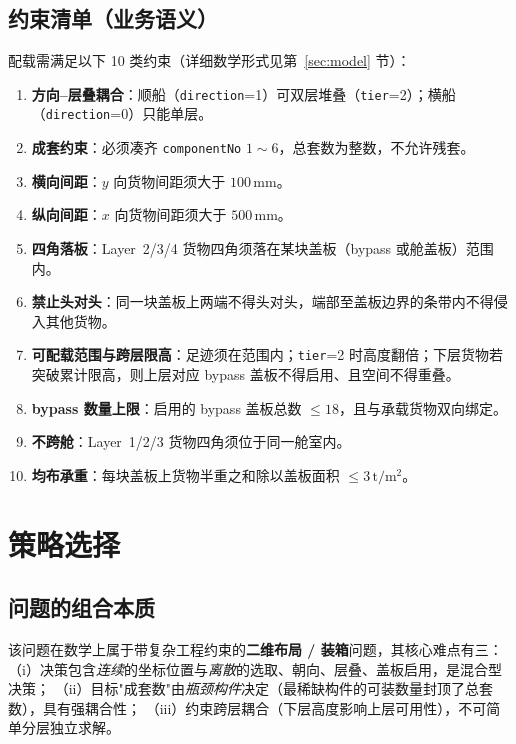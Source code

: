 \documentclass[11pt]{article}
\newcommand{\unit}[1]{\,\mathrm{#1}}
\begin{document}
\subsection{约束清单（业务语义）}
\label{sec:constraints-biz}
配载需满足以下 10 类约束（详细数学形式见第~\ref{sec:model} 节）：
\begin{enumerate}[label=C\arabic*.,leftmargin=2.6em,itemsep=2pt]
  \item \textbf{方向--层叠耦合}：顺船（\texttt{direction}=1）可双层堆叠（\texttt{tier}=2）；横船（\texttt{direction}=0）只能单层。
  \item \textbf{成套约束}：必须凑齐 \texttt{componentNo} $1\sim6$，总套数为整数，不允许残套。
  \item \textbf{横向间距}：$y$ 向货物间距须大于 $100\unit{mm}$。
  \item \textbf{纵向间距}：$x$ 向货物间距须大于 $500\unit{mm}$。
  \item \textbf{四角落板}：Layer~2/3/4 货物四角须落在某块盖板（bypass 或舱盖板）范围内。
  \item \textbf{禁止头对头}：同一块盖板上两端不得头对头，端部至盖板边界的条带内不得侵入其他货物。
  \item \textbf{可配载范围与跨层限高}：足迹须在范围内；\texttt{tier}=2 时高度翻倍；下层货物若突破累计限高，则上层对应 bypass 盖板不得启用、且空间不得重叠。
  \item \textbf{bypass 数量上限}：启用的 bypass 盖板总数 $\le 18$，且与承载货物双向绑定。
  \item \textbf{不跨舱}：Layer~1/2/3 货物四角须位于同一舱室内。
  \item \textbf{均布承重}：每块盖板上货物半重之和除以盖板面积 $\le 3\unit{t/m^2}$。
\end{enumerate}

\section{策略选择}

\subsection{问题的组合本质}
该问题在数学上属于带复杂工程约束的\textbf{二维布局 / 装箱}问题，其核心难点有三：
（i）决策包含\emph{连续}的坐标位置与\emph{离散}的选取、朝向、层叠、盖板启用，是混合型决策；
（ii）目标"成套数"由\emph{瓶颈构件}决定（最稀缺构件的可装数量封顶了总套数），具有强耦合性；
（iii）约束跨层耦合（下层高度影响上层可用性），不可简单分层独立求解。
\end{document}
